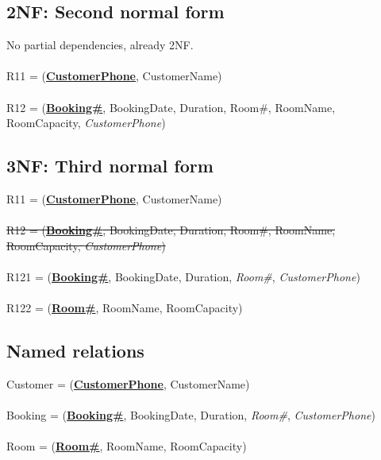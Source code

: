 \subsection{2NF: Second normal form}

No partial dependencies, already 2NF.
\\\\
R11 = (\textbf{\underline{CustomerPhone}}, CustomerName)
\\\\
R12 = (\textbf{\underline{Booking\#}}, BookingDate, Duration, Room\#, RoomName, RoomCapacity, \emph{CustomerPhone})

\subsection{3NF: Third normal form}

R11 = (\textbf{\underline{CustomerPhone}}, CustomerName)
\\\\
\sout{R12 = (\textbf{\underline{Booking\#}}, BookingDate, Duration, Room\#, RoomName, RoomCapacity, \emph{CustomerPhone})}
\\\\
R121 = (\textbf{\underline{Booking\#}}, BookingDate, Duration, \emph{Room\#}, \emph{CustomerPhone})
\\\\
R122 = (\textbf{\underline{Room\#}}, RoomName, RoomCapacity)

\subsection{Named relations}

Customer = (\textbf{\underline{CustomerPhone}}, CustomerName)
\\\\
Booking = (\textbf{\underline{Booking\#}}, BookingDate, Duration, \emph{Room\#}, \emph{CustomerPhone})
\\\\
Room = (\textbf{\underline{Room\#}}, RoomName, RoomCapacity)